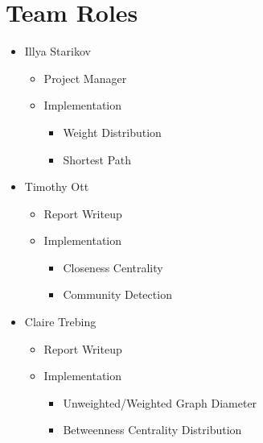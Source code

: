 \documentclass{article}
\begin{document}
\section{Team Roles}
\begin{itemize}
    \item Illya Starikov
    \begin{itemize}
        \item Project Manager
        \item Implementation
        \begin{itemize}
            \item Weight Distribution
            \item Shortest Path
        \end{itemize}
    \end{itemize}

    \item Timothy Ott
    \begin{itemize}
        \item Report Writeup
        \item Implementation
        \begin{itemize}
            \item Closeness Centrality
            \item Community Detection
        \end{itemize}
    \end{itemize}

    \item Claire Trebing
    \begin{itemize}
        \item Report Writeup
        \item Implementation
        \begin{itemize}
            \item Unweighted/Weighted Graph Diameter
            \item Betweenness Centrality Distribution
        \end{itemize}
    \end{itemize}
\end{itemize}
\end{document}
